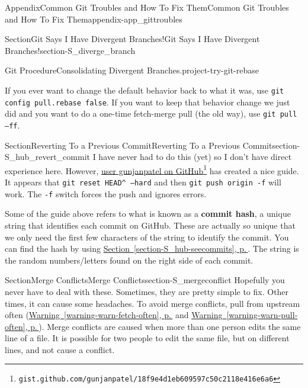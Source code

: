 \documentclass[twoside,10pt,]{book}
\newcommand{\xreffont}{\relax}
\newcommand{\mono}[1]{\texttt{#1}}
\newcommand{\terminology}[1]{\textbf{#1}}
\begin{document}
\begin{appendixptx}{Appendix}{Common Git Troubles and How To Fix Them}{}{Common Git Troubles and How To Fix Them}{}{}{appendix-app_gittroubles}
\begin{sectionptx}{Section}{Git Says I Have Divergent Branches!}{}{Git Says I Have Divergent Branches!}{}{}{section-S_diverge_branch}
\begin{project}{Git Procedure}{Consolidating Divergent Branches.}{project-try-git-rebase}
\begin{enumerate}[font=\bfseries,label=(\alph*),ref=\alph*]
If you ever want to change the default behavior back to what it was, use \mono{git config pull.rebase false}. If you want to keep that behavior change we just did and you want to do a one-time fetch-merge pull (the old way), use \mono{git pull --ff}.%
\end{enumerate}%
\end{project}%
\end{sectionptx}
%
%
\typeout{************************************************}
\typeout{************************************************}
%
\begin{sectionptx}{Section}{Reverting To a Previous Commit}{}{Reverting To a Previous Commit}{}{}{section-S_hub_revert_commit}
%
%
%
%
%
I have never had to do this (yet) so I don't have direct experience here. However, \href{https://gist.github.com/gunjanpatel/18f9e4d1eb609597c50c2118e416e6a6}{user gunjanpatel on GitHub}\footnote{\nolinkurl{gist.github.com/gunjanpatel/18f9e4d1eb609597c50c2118e416e6a6}\label{fn-S_hub_revert_commit-g-b}} has created a nice guide. It appears that \mono{git reset HEAD\textasciicircum{} --hard} and then \mono{git push origin -f} will work. The \mono{-f} switch forces the push and ignores errors.%
\par
Some of the guide above refers to what is known as a \terminology{commit hash}, a unique string that identifies each commit on GitHub. These are actually so unique that we only need the first few characters of the string to identify the commit. You can find the hash by using \hyperref[section-S_hub-seecommits]{Section~{\xreffont\ref{section-S_hub-seecommits}}, p.\,\pageref{section-S_hub-seecommits}}. The string is the random numbers\slash{}letters found on the right side of each commit.%
\end{sectionptx}
%
%
\typeout{************************************************}
\typeout{************************************************}
%
\begin{sectionptx}{Section}{Merge Conflicts}{}{Merge Conflicts}{}{}{section-S_mergeconflict}
Hopefully you never have to deal with these. Sometimes, they are pretty simple to fix. Other times, it can cause some headaches. To avoid merge conflicts, pull from upstream often (\hyperref[warning-warn-fetch-often]{Warning~{\xreffont\ref{warning-warn-fetch-often}}, p.\,\pageref{warning-warn-fetch-often}} and \hyperref[warning-warn-pull-often]{Warning~{\xreffont\ref{warning-warn-pull-often}}, p.\,\pageref{warning-warn-pull-often}}). Merge conflicts are caused when more than one person edits the same line of a file. It is possible for two people to edit the same file, but on different lines, and not cause a conflict.%

\end{sectionptx}
\end{appendixptx}
\end{document}

